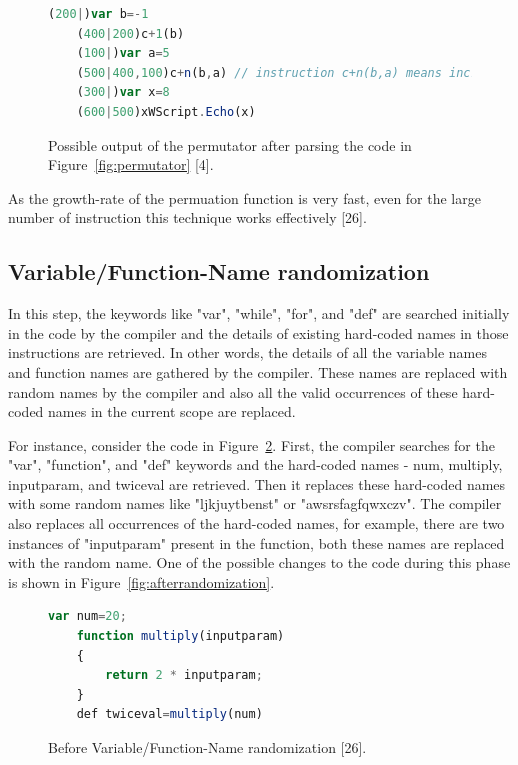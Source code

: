\begin{figure}
  \centering
  \begin{lstlisting}[language=JavaScript]
	(200|)var b=-1
	(400|200)c+1(b)
	(100|)var a=5	
	(500|400,100)c+n(b,a) // instruction c+n(b,a) means increasing b by a: i.e. b+=a
	(300|)var x=8
	(600|500)xWScript.Echo(x)
\end{lstlisting}
    \caption[Permutator output]{Possible output of the permutator after parsing the code in Figure~\ref{fig:permutator} [4].}
    \label{fig:afterpermutator}
\end{figure}

As the growth-rate of the permuation function is very fast, even for the large number of instruction this technique works effectively [26].

\subsection{Variable/Function-Name randomization}

In this step, the keywords like "var", "while", "for", and "def" are searched initially in the code by the compiler and the details of existing hard-coded names in those instructions are retrieved. In other words, the details of all the variable names and function names are gathered by the compiler. These names are replaced with random names by the compiler and also all the valid occurrences of these hard-coded names in the current scope are replaced.

For instance, consider the code in Figure~\ref{fig:randomization}. First, the compiler searches for the "var", "function", and "def" keywords and the hard-coded names - num, multiply, inputparam, and twiceval are retrieved. Then it replaces these hard-coded names with some random names like "ljkjuytbenst" or "awsrsfagfqwxczv". The compiler also replaces all occurrences of the hard-coded names, for example, there are two instances of "inputparam" present in the function, both these names are replaced with the random name. One of the possible changes to the code during this phase is shown in Figure~\ref{fig:afterrandomization}. 

\begin{figure}
  \centering
  \begin{lstlisting}[language=JavaScript]
	var num=20;
	function multiply(inputparam) 
	{ 
		return 2 * inputparam; 
	}
	def twiceval=multiply(num)
\end{lstlisting}
    \caption[Before Variable/Function-Name randomization]{Before Variable/Function-Name randomization [26].}
    \label{fig:randomization}
\end{figure}

